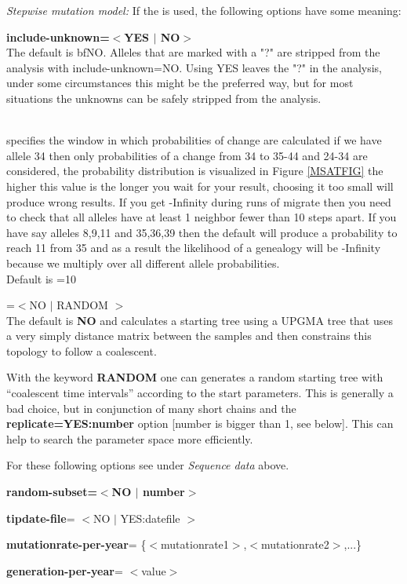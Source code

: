 \textsl{Stepwise mutation model:}
If the {} is used, the following options have some meaning:\begin{description}
\item{\bf{ include-unknown=$<$YES $|$ NO$>$}}\\ The default is {bf{NO}}. Alleles that are marked with a "?" are stripped from the analysis  with include-unknown=NO. Using YES leaves the "?" in the analysis, under some circumstances this might be the preferred way, but for most situations the unknowns can be safely stripped from the analysis.
 \item{}\\
specifies the window in which probabilities of change are calculated
if we have allele 34 then only probabilities of a change from 34 to 35-44
and 24-34 are considered, the probability distribution is visualized in Figure \ref{MSATFIG} the higher this value is the longer you wait for your result, choosing it too small will produce wrong results. If you get 
-Infinity during runs of migrate then you need to check that
all alleles have at least 1 neighbor fewer than 10 steps apart.
If you have say alleles 8,9,11 and 35,36,39 then the default will
produce a probability to reach 11 from 35 and as a result the 
likelihood of a genealogy will be -Infinity because we multiply over
all different allele probabilities.\\
Default is {=10}
\item{=$<$NO $|$  RANDOM $>$}\\
The default is \textbf{NO} and \migrate calculates a starting tree using a UPGMA tree that uses a very simply distance matrix between the samples and then constrains this topology to follow a coalescent. 

 With the keyword \textbf{RANDOM} one can generates a random starting tree with ``coalescent time intervals''  according to the start parameters. This is generally a bad choice,  but in conjunction of many short chains and the {\bf replicate=YES:number} 
option [number is bigger than 1, see below]. This can help to search the 
parameter space more efficiently.
\end{description}

For these following options see under \textsl{Sequence data} above.
\begin{description}
\item {\bf random-subset=$<$NO $|$ number$>$}
\item{\bf tipdate-file}= $<$NO $|$ YES:datefile $>$ 
\item{\bf mutationrate-per-year}= \{$<$mutationrate1$>$,$<$mutationrate2$>$,...\} 
\item{\bf generation-per-year}= $<$value$>$ 
\end{description}

